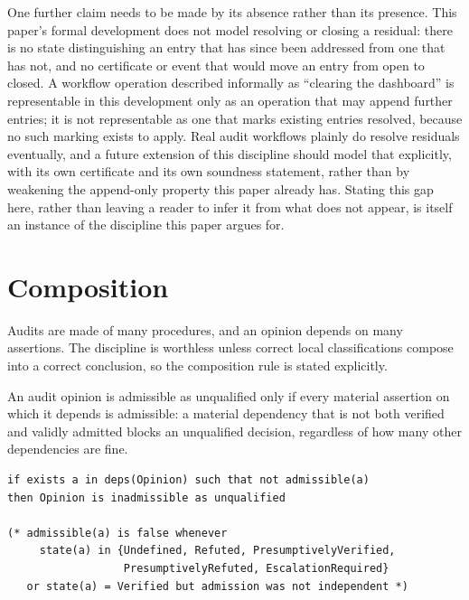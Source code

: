 \documentclass[smallcondensed,envcountsect,natbib]{svjour3}
\begin{document}
One further claim needs to be made by its absence rather than its presence. This paper's formal development does not model resolving or closing a residual: there is no state distinguishing an entry that has since been addressed from one that has not, and no certificate or event that would move an entry from open to closed. A workflow operation described informally as ``clearing the dashboard'' is representable in this development only as an operation that may append further entries; it is not representable as one that marks existing entries resolved, because no such marking exists to apply. Real audit workflows plainly do resolve residuals eventually, and a future extension of this discipline should model that explicitly, with its own certificate and its own soundness statement, rather than by weakening the append-only property this paper already has. Stating this gap here, rather than leaving a reader to infer it from what does not appear, is itself an instance of the discipline this paper argues for.

\section{Composition}
\label{sec:composition}

Audits are made of many procedures, and an opinion depends on many assertions. The discipline is worthless unless correct local classifications compose into a correct conclusion, so the composition rule is stated explicitly.

\begin{rul}[Composition]
\label{rule:composition}
An audit opinion is admissible as unqualified only if every material assertion on which it depends is admissible: a material dependency that is not both verified and validly admitted blocks an unqualified decision, regardless of how many other dependencies are fine.
\end{rul}

\begin{lstlisting}
if exists a in deps(Opinion) such that not admissible(a)
then Opinion is inadmissible as unqualified

(* admissible(a) is false whenever
     state(a) in {Undefined, Refuted, PresumptivelyVerified,
                  PresumptivelyRefuted, EscalationRequired}
   or state(a) = Verified but admission was not independent *)
\end{lstlisting}
\end{document}
